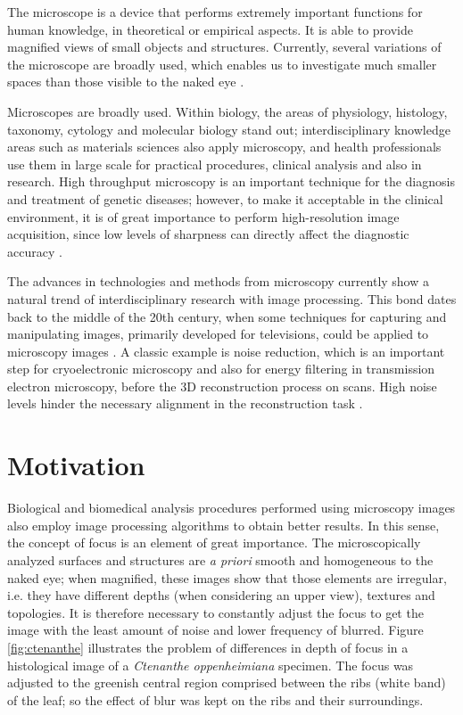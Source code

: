 The microscope is a device that performs extremely important functions for human knowledge, in theoretical or empirical aspects. It is able to provide magnified views of small objects and structures. Currently, several variations of the
microscope are broadly used, which enables us to investigate much smaller spaces than those visible to the naked eye \cite{wu2008microscope}.

Microscopes are broadly used. Within biology, the areas of physiology, histology, taxonomy, cytology and molecular biology stand out; interdisciplinary knowledge areas such as materials sciences also apply microscopy, and health professionals use them in large scale for practical procedures, clinical analysis and also in research. High throughput microscopy is an important technique for the diagnosis and treatment of genetic diseases; however, to make it acceptable in the clinical environment, it is of great importance to perform high-resolution image acquisition, since low levels of sharpness can directly affect the diagnostic accuracy \cite{qiu2013evaluations}.

The advances in technologies and methods from microscopy currently show a natural trend of interdisciplinary research with image processing. This bond dates back to the middle of the 20th century, when some techniques for capturing and manipulating images, primarily developed for televisions, could be
applied to microscopy images \cite{wu2008microscope}. A classic example is noise reduction, which is an important step for cryoelectronic microscopy and also for energy filtering in transmission electron microscopy, before the 3D reconstruction process on  scans. High noise levels hinder the necessary alignment in the reconstruction task \cite{vyas2017multiscale}.

\section{Motivation}

Biological and biomedical analysis procedures performed using microscopy images also employ image processing algorithms to obtain better results. In this sense, the concept of focus is an element of great importance. The microscopically analyzed surfaces and structures are \emph{a priori} smooth and homogeneous to the naked eye; when magnified, these images show that those elements are irregular, i.e. they have different depths (when considering an upper view), textures and topologies. It is therefore necessary to constantly adjust the focus to get the image with the least amount of noise and lower frequency of blurred. Figure \ref{fig:ctenanthe} illustrates the problem of differences in depth of focus in a histological image of a \emph{Ctenanthe oppenheimiana} specimen. The focus was adjusted to the greenish central region comprised between the ribs (white band) of the leaf; so the effect of blur was kept on the ribs and their surroundings.

